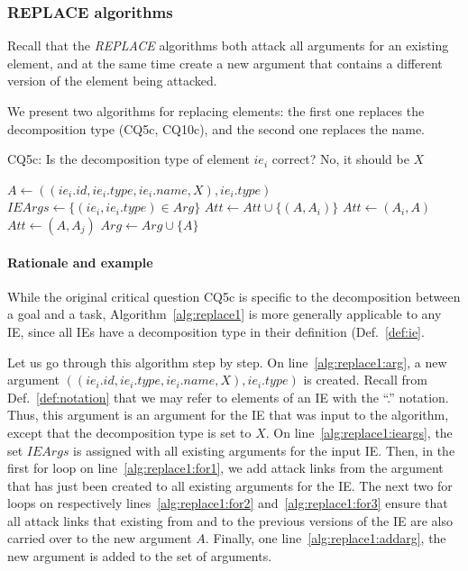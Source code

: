 \subsubsection{REPLACE algorithms}

Recall that the \emph{REPLACE} algorithms both attack all arguments for an existing element, and at the same time create a new argument that contains a different version of the element being attacked.

We present two algorithms for replacing elements: the first one replaces the decomposition type (CQ5c, CQ10c), and the second one replaces the name. 

\begin{algorithm}[h]
  \caption{CQ5c: Is the decomposition type of element $ie_i$ correct? No, it should be $X$ }\label{alg:replace1}
  \begin{algorithmic}[1]
    \State $A \leftarrow ((ie_i.id, ie_i.type, ie_i.name, X),ie_i.type)$\label{alg:replace1:arg}
    \State $IEArgs\leftarrow \{(ie_i,ie_i.type)\in Arg\}$\label{alg:replace1:ieargs}
    \label{alg:replace1:for1}
      \State $Att \leftarrow Att \cup \{(A,A_i)\}$\label{alg:replace1:att}
    \EndFor
    \label{alg:replace1:for2}
      \State $Att\leftarrow (A_i,A)$
    \EndFor
    \label{alg:replace1:for3}
      \State $Att\leftarrow (A,A_j)$
    \EndFor
    \State $Arg\leftarrow Arg \cup \{A\}$\label{alg:replace1:addarg}
    \EndProcedure
  \end{algorithmic}
\end{algorithm}

\paragraph{Rationale and example} While the original critical question CQ5c is specific to the decomposition between a goal and a task, Algorithm~\ref{alg:replace1} is more generally applicable to any IE, since all IEs have a decomposition type in their definition (Def.~\ref{def:ie}. 

Let us go through this algorithm step by step. On line~\ref{alg:replace1:arg}, a new argument $((ie_i.id, ie_i.type, ie_i.name, X),ie_i.type)$ is created. Recall from Def.~\ref{def:notation} that we may refer to elements of an IE with the ``.'' notation. Thus, this argument is an argument for the IE that was input to the algorithm, except that the decomposition type is set to $X$. On line~\ref{alg:replace1:ieargs}, the set $IEArgs$ is assigned with all existing arguments for the input IE. Then, in the first for loop on line~\ref{alg:replace1:for1}, we add attack links from the argument that has just been created to all existing arguments for the IE. The next two for loops on respectively lines~\ref{alg:replace1:for2} and~\ref{alg:replace1:for3} ensure that all attack links that existing from and to the previous versions of the IE are also carried over to the new argument $A$. Finally, one line~\ref{alg:replace1:addarg}, the new argument is added to the set of arguments.

